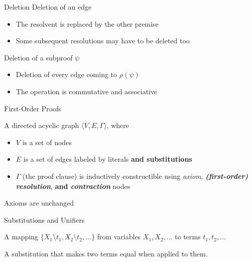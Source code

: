 {

\begin{frame}{Deletion}
Deletion of an edge\\
\begin{itemize}
\item The resolvent is replaced by the other premise
\item Some subsequent resolutions may have to be deleted too
\end{itemize}
\vspace{1cm}
Deletion of a subproof $\psi$\\
\begin{itemize}
\item Deletion of every edge coming to $\rho(\psi)$
\item The operation is commutative and associative
\end{itemize}
\end{frame}
}


{

\begin{frame}{First-Order Proofs}
\begin{definition}
A directed acyclic graph $\langle V,E,\Gamma \rangle$, where
\begin{itemize}
\item $V$ is a set of nodes
\item $E$ is a set of edges labeled by literals {\bf and substitutions}
\item $\Gamma$ (the proof clause) is inductively constructible using \emph{axiom}, {\bf\emph{(first-order) resolution}}, {\bf and \emph{contraction}} nodes
\end{itemize}
\end{definition}
\vspace{0.5cm}
Axioms are unchanged
\end{frame}
}

{

\begin{frame}{Substitutions and Unifiers}
\begin{definition}[Substitution]
A mapping $\{X_1\setminus t_1, X_2\setminus t_2,\ldots\}$ from variables $X_1,X_2,\ldots$ to terms $t_1,t_2,\ldots$
\end{definition}


\begin{definition}[Unifier]
A substitution that makes two terms equal when applied to them.
\end{definition}

\end{frame}
}



